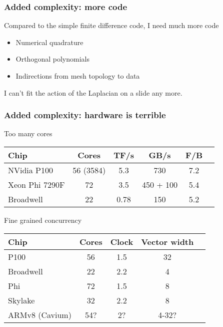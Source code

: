 \documentclass[presentation]{beamer}
\begin{document}
\begin{frame}
  \frametitle{Added complexity: more code}
  Compared to the simple finite difference code, I need much more code

  \begin{itemize}
  \item Numerical quadrature
  \item Orthogonal polynomials
  \item Indirections from mesh topology to data
  \end{itemize}

  I can't fit the action of the Laplacian on a slide any more.
\end{frame}

\begin{frame}
  \frametitle{Added complexity: hardware is terrible}
  \begin{center}
    \begin{block}{Too many cores}
      \small
      \begin{tabular}{lccccc}
        Chip           & Cores     & TF/s & GB/s      & F/B \\
        \hline
        NVidia P100    & 56 (3584) & 5.3  & 730       & 7.2 \\
        Xeon Phi 7290F & 72        & 3.5  & 450 + 100 & 5.4 \\
        Broadwell      & 22        & 0.78 & 150       & 5.2 \\
      \end{tabular}
    \end{block}
    \begin{block}{Fine grained concurrency}
      \small
      \begin{tabular}{lcccc}
        Chip           & Cores & Clock & Vector width \\
        \hline
        P100           & 56    & 1.5   & 32           \\
        Broadwell      & 22    & 2.2   & 4            \\
        Phi            & 72    & 1.5   & 8            \\
        Skylake        & 32    & 2.2   & 8            \\
        ARMv8 (Cavium) & 54?   & 2?    & 4-32?        \\
      \end{tabular}
    \end{block}
  \end{center}
\end{frame}
\end{document}
